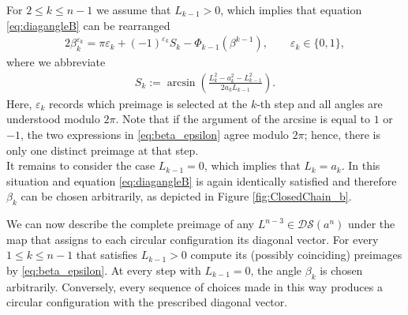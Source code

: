 \documentclass[10pt,a4paper]{article}
\theoremstyle{definition}
\theoremstyle{remark}
\numberwithin{equation}{section}
\newcommand{\vep}{\varepsilon}
\begin{document}
For $2\leq k\leq n-1$ we assume that $L_{k-1}>0$, which implies that equation \eqref{eq:diagangleB} can be rearranged 
\begin{alignat}{2}\label{eq:beta_epsilon}
\beta_k^{\vep_k}
=
\pi\vep_k
+
(-1)^{\vep_k}S_k
-
\Phi_{k-1}\left(
\beta^{k-1}
\right),
\qquad
\vep_k\in\{0,1\},
\end{alignat}
where we abbreviate
\begin{align*}
S_k
:=
\arcsin\left(
\frac{L_k^2-a_k^2-L_{k-1}^2}{2a_kL_{k-1}}
\right).
\end{align*}
Here, $\vep_k$ records which preimage is selected at the $k$-th step and all angles are understood modulo $2\pi$. Note that if the argument of the arcsine is equal to $1$ or $-1$, the two expressions in \eqref{eq:beta_epsilon} agree modulo $2\pi$; hence, there is only one distinct preimage at that step.\\

It remains to consider the case $L_{k-1}=0$, which implies that $L_k=a_k$. In this situation and equation \eqref{eq:diagangleB} is again identically satisfied and therefore $\beta_k$ can be chosen arbitrarily, as depicted in Figure \ref{fig:ClosedChain_b}. 

We can now describe the complete preimage of any $L^{n-3}\in\mathcal{DS}(a^n)$ under the map that assigns to each circular configuration its diagonal vector. For every $1\leq k \leq n-1$ that satisfies $L_{k-1}>0$ compute its (possibly coinciding) preimages by \eqref{eq:beta_epsilon}. At every step with $L_{k-1}=0$, the angle $\beta_k$ is chosen arbitrarily. Conversely, every sequence of choices made in this way produces a circular configuration with the prescribed diagonal vector.
\end{document}
